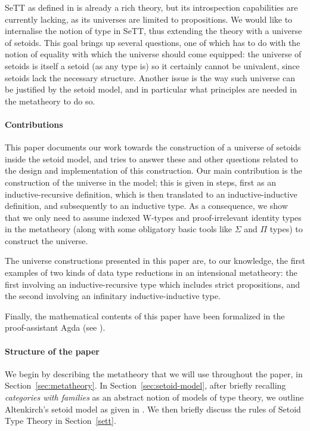 \documentclass[a4paper,UKenglish,cleveref, autoref, thm-restate]{lipics-v2019}
\begin{document}
SeTT as defined in \cite{mpc19} is already a rich theory, but its introspection
capabilities are currently lacking, as its universes are limited to
propositions. We would like to internalise the notion of type in SeTT, thus
extending the theory with a universe of setoids.
%
This goal brings up several questions, one of which has to do with the notion of
equality with which the universe should come equipped: the universe of setoids
is itself a setoid (as any type is) so it certainly cannot be univalent, since
setoids lack the necessary structure.
%
Another issue is the way such universe can be justified by the setoid model, and
in particular what principles are needed in the metatheory to do so.

\paragraph*{Contributions}

This paper documents our work towards the construction of a universe of setoids
inside the setoid model, and tries to answer these and other questions related
to the design and implementation of this construction. Our main contribution is
the construction of the universe in the model; this is given in steps, first as
an inductive-recursive definition, which is then translated to an
inductive-inductive definition, and subsequently to an inductive type. As a
consequence, we show that we only need to assume indexed W-types and
proof-irrelevant identity types in the metatheory (along with some obligatory
basic tools like $\Sigma$ and $\Pi$ types) to construct the universe.

The universe constructions presented in this paper are, to our knowledge, the
first examples of two kinds of data type reductions in an intensional
metatheory: the first involving an inductive-recursive type which includes
strict propositions, and the second involving an infinitary inductive-inductive
type.

Finally, the mathematical contents of this paper have been formalized in the
proof-assistant Agda (see \cite{agda-code}).

\paragraph*{Structure of the paper}

We begin by describing the metatheory that we will use throughout the paper, in
Section~\ref{sec:metatheory}. In Section~\ref{sec:setoid-model}, after briefly
recalling \emph{categories with families} as an abstract notion of models of
type theory, we outline Altenkirch's setoid model as given in \cite{mpc19}. We
then briefly discuss the rules of Setoid Type Theory in Section~\ref{sett}.
\end{document}
